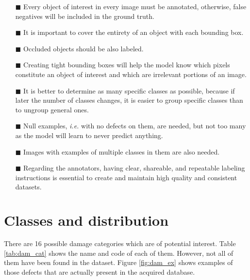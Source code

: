 \begin{itemize}[]
    \item[\tiny$\blacksquare$]\textbf{}Every object of interest in every image must be annotated, otherwise, false negatives will be included in the ground truth.
    \item[\tiny$\blacksquare$] \textbf{}It is important to cover the entirety of an object with each bounding box. 
    \item[\tiny$\blacksquare$] \textbf{}Occluded objects should be also labeled.
    \item[\tiny$\blacksquare$] \textbf{}Creating tight bounding boxes will help the model know which pixels constitute an object of interest and which are irrelevant portions of an image.
    \item[\tiny$\blacksquare$] \textbf{}It is better to determine as many specific classes as possible, because if later the number of classes changes, it is easier to group specific classes than to ungroup general ones.
    \item[\tiny$\blacksquare$] \textbf{}Null examples, \emph{i.e.} with no defects on them, are needed, but not too many as the model will learn to never predict anything.
    \item[\tiny$\blacksquare$] \textbf{}Images with examples of multiple classes in them are also needed.
    \item[\tiny$\blacksquare$] \textbf{}Regarding the annotators, having clear, shareable, and repeatable labeling instructions is essential to create and maintain high quality and consistent datasets.
\end{itemize}


\section{Classes and distribution}
\label{sec:classDistribution}

There are 16 possible damage categories which are of potential interest. Table \ref{tab:dam_cat} shows the name and code of each of them. However, not all of them have been found in the dataset. Figure \ref{fig:dam_ex} shows examples of those defects that are actually present in the acquired database.

